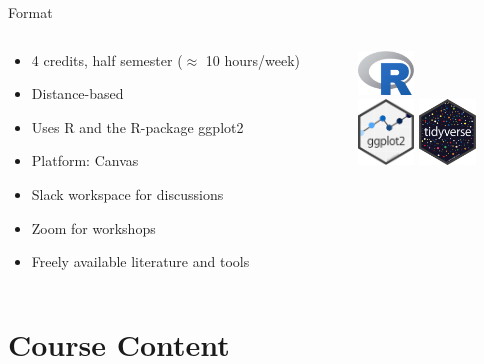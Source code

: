 \begin{frame}[c]{Format}
  \begin{columns}[T,onlytextwidth]
    \begin{column}{0.7\linewidth}
      \begin{itemize}
        \item 4 credits, half semester (\(\approx\) 10 hours/week)
        \item Distance-based
        \item Uses R and the R-package ggplot2
        \item Platform: Canvas
        \item Slack workspace for discussions
        \item Zoom for workshops
        \item Freely available literature and tools
      \end{itemize}
    \end{column}
    \begin{column}{0.3\linewidth}
      \centering
      \includegraphics[width=1.5cm]{figures/r-logo.png}\\
      \vspace{3ex}
      \includegraphics[width=1.5cm]{figures/ggplot2.png}
      \vspace{3ex}
      \includegraphics[width=1.5cm]{figures/tidyverse-logo.png}
    \end{column}
  \end{columns}
\end{frame}

\section{Course Content}

